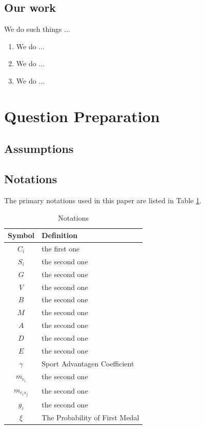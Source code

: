 \documentclass[12pt]{article}  %
\begin{document}
\subsection{Our work}
We do such things ...




\begin{enumerate}[\bfseries 1.]
    \item We do ...
    \item We do ...
    \item We do ...
\end{enumerate}
\section{Question Preparation}
\subsection{Assumptions}


\subsection{Notations}

The primary notations used in this paper are listed in Table \ref{tb:notation}.

\begin{table}[!htbp]
\begin{center}
\caption{Notations}
\begin{tabular}{cl}
	\toprule
	\multicolumn{1}{m{3cm}}{\centering Symbol}
	&\multicolumn{1}{m{8cm}}{\centering Definition}\\
	\midrule
	$C_{i}$&the first one\\
	$S_{i}$&the second one\\
	$G$&the second one\\
	$V$&the second one\\
	$B$&the second one\\
	$M$&the second one\\
	$A$&the second one\\
	$D$&the second one\\
	$E$&the second one\\
    $\gamma$&Sport Advantagen Coefficient\\
  	$ m_{c_{i}}$ &the second one\\
	$ m_{c_{i} s_{j}}$ &the second one\\
    $g_{i}$&the second one\\
    $\xi$&The Probability of First Medal\\
	\bottomrule
\end{tabular}\label{tb:notation}
\end{center}
\end{table}
\end{document}

